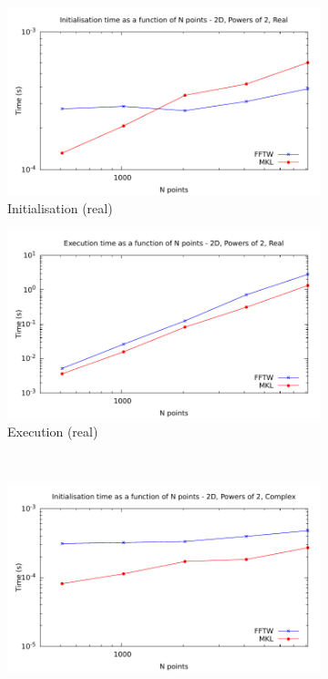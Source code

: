 \documentclass[12pt, a4paper]{article} \setlength{\textheight}{24cm}
\begin{document}
\begin{figure}[H]
  \centering
  \begin{subfigure}{.5\textwidth}
    \centering
    \includegraphics[width=.9\linewidth]{graphs/2d-pow2-init-r.pdf}
    \caption{Initialisation (real)}
    \label{2DPOW2RI}
  \end{subfigure}%
  \begin{subfigure}{.5\textwidth}
    \centering
    \includegraphics[width=.9\linewidth]{graphs/2d-pow2-exec-r.pdf}
    \caption{Execution (real)}
    \label{2DPOW2R}
  \end{subfigure}\\
  \begin{subfigure}{.5\textwidth}
    \centering
    \includegraphics[width=.9\linewidth]{graphs/2d-pow2-init-c.pdf}

\end{subfigure}
\end{figure}
\end{document}
